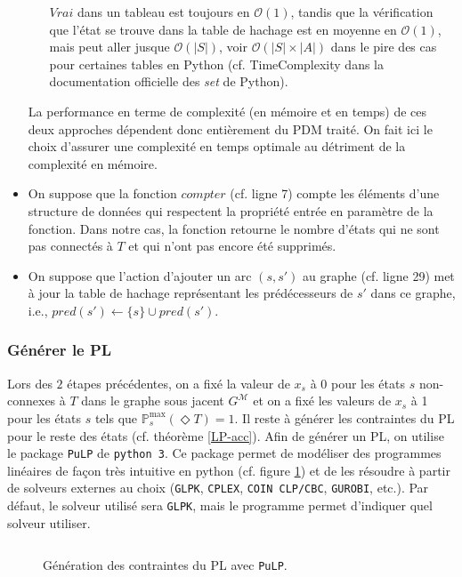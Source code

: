 \documentclass[12pt,a4paper]{report}
\theoremstyle{definition}%
\theoremstyle{remark}
\newcommand{\pr}{\mathbb{P}}
\begin{document}
\begin{itemize}
\begin{itemize}
				$Vrai$ dans un tableau est toujours en $\mathcal{O}(1)$, tandis que
				la vérification que l'état se trouve dans la table de hachage est en
				moyenne en $\mathcal{O}(1)$, mais peut aller jusque $\mathcal{O}(|S|)$,
				voir $\mathcal{O}(|S| \times |A|)$ dans le pire des cas pour certaines
				tables en Python (cf. TimeComplexity dans la documentation officielle des \textit{set} de Python).
		\end{itemize}
		La performance en terme de complexité (en mémoire et en temps) de ces deux
		approches dépendent donc entièrement du PDM traité. On fait ici le choix
		d'assurer une complexité en temps optimale au détriment de la complexité
		en mémoire.
		\item On suppose que la fonction $compter$ (cf. ligne 7) compte les éléments d'une
			structure de données qui respectent la propriété entrée en paramètre de la fonction.
			Dans notre cas, la fonction retourne le nombre d'états qui ne sont pas
			connectés à $T$ et qui n'ont pas encore été supprimés.
		\item On suppose que l'action d'ajouter un arc $(s, s')$ au graphe (cf.
			ligne 29) met à jour la table de hachage représentant les prédécesseurs de $s'$ dans ce graphe, i.e., $pred(s') \gets \{s\} \cup pred(s')$.
	\end{itemize}

\subsubsection*{Générer le PL}
Lors des $2$ étapes précédentes, on a fixé la valeur de $x_s$ à 0 pour les états
$s$ non-connexes à $T$ dans le graphe sous jacent $G^\mathcal{M}$ et on a fixé
les valeurs de $x_s$ à 1 pour les états $s$ tels que $\pr^{\max}_s(\Diamond T) = 1$. Il reste à générer les contraintes du PL pour le reste des états (cf. théorème \ref{LP-acc}).
Afin de générer un PL, on utilise le package \verb|PuLP| de
\verb|python 3|. Ce package permet de modéliser des programmes linéaires de
façon très intuitive en python (cf. figure \ref{reach-pulp}) et de les résoudre à partir de solveurs
externes au choix (\verb|GLPK|, \verb|CPLEX|, \verb|COIN CLP/CBC|, \verb|GUROBI|, etc.).
Par défaut, le solveur utilisé sera \verb|GLPK|, mais le programme permet
d'indiquer quel solveur utiliser.
\begin{figure}[H]
	\centering
	\scriptsize
	\inputminted{python}{PLexample.py}
	\cprotect\caption{Génération des contraintes du PL avec \verb|PuLP|.}
	\label{reach-pulp}
\end{figure}
\end{document}
